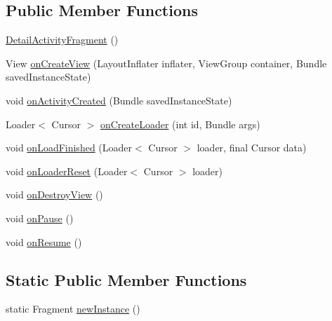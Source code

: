 \subsection*{Public Member Functions}
\begin{DoxyCompactItemize}
\item 
\hyperlink{classorg_1_1buildmlearn_1_1toolkit_1_1dictationtemplate_1_1fragment_1_1DetailActivityFragment_a41fc77f6133131ff596a1b869543286c}{Detail\+Activity\+Fragment} ()
\item 
View \hyperlink{classorg_1_1buildmlearn_1_1toolkit_1_1dictationtemplate_1_1fragment_1_1DetailActivityFragment_a401a795096b8f55c79281dd3a1caf4e7}{on\+Create\+View} (Layout\+Inflater inflater, View\+Group container, Bundle saved\+Instance\+State)
\item 
void \hyperlink{classorg_1_1buildmlearn_1_1toolkit_1_1dictationtemplate_1_1fragment_1_1DetailActivityFragment_a1aea0fb03edbf75b82224ec0c5cda747}{on\+Activity\+Created} (Bundle saved\+Instance\+State)
\item 
Loader$<$ Cursor $>$ \hyperlink{classorg_1_1buildmlearn_1_1toolkit_1_1dictationtemplate_1_1fragment_1_1DetailActivityFragment_a05c4845d46dfb179ecd69ffdba59989e}{on\+Create\+Loader} (int id, Bundle args)
\item 
void \hyperlink{classorg_1_1buildmlearn_1_1toolkit_1_1dictationtemplate_1_1fragment_1_1DetailActivityFragment_aa471123d4cee98418764c7ccccbbc543}{on\+Load\+Finished} (Loader$<$ Cursor $>$ loader, final Cursor data)
\item 
void \hyperlink{classorg_1_1buildmlearn_1_1toolkit_1_1dictationtemplate_1_1fragment_1_1DetailActivityFragment_ada800d3d5d12230b4d6a4cbea4131c0b}{on\+Loader\+Reset} (Loader$<$ Cursor $>$ loader)
\item 
void \hyperlink{classorg_1_1buildmlearn_1_1toolkit_1_1dictationtemplate_1_1fragment_1_1DetailActivityFragment_afd7790a45100f86fc856af5c3ac1e9e3}{on\+Destroy\+View} ()
\item 
void \hyperlink{classorg_1_1buildmlearn_1_1toolkit_1_1dictationtemplate_1_1fragment_1_1DetailActivityFragment_ac8fc877c0664e01fea4cac041fa2f961}{on\+Pause} ()
\item 
void \hyperlink{classorg_1_1buildmlearn_1_1toolkit_1_1dictationtemplate_1_1fragment_1_1DetailActivityFragment_ac6675b626abb0bc514c94a6818384291}{on\+Resume} ()
\end{DoxyCompactItemize}
\subsection*{Static Public Member Functions}
\begin{DoxyCompactItemize}
\item 
static Fragment \hyperlink{classorg_1_1buildmlearn_1_1toolkit_1_1dictationtemplate_1_1fragment_1_1DetailActivityFragment_af280d96dcc59a14af7f9bdd155116a1f}{new\+Instance} ()
\end{DoxyCompactItemize}
